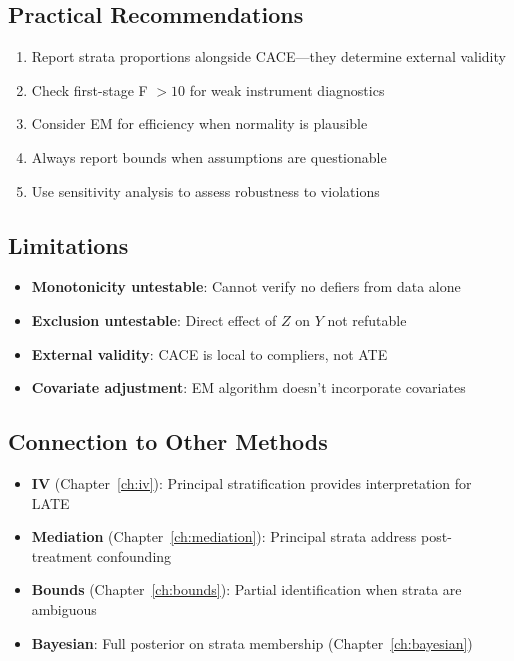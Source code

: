 \subsection{Practical Recommendations}

\begin{enumerate}
\item Report strata proportions alongside CACE---they determine external validity
\item Check first-stage F $> 10$ for weak instrument diagnostics
\item Consider EM for efficiency when normality is plausible
\item Always report bounds when assumptions are questionable
\item Use sensitivity analysis to assess robustness to violations
\end{enumerate}

\subsection{Limitations}

\begin{itemize}
\item \textbf{Monotonicity untestable}: Cannot verify no defiers from data alone
\item \textbf{Exclusion untestable}: Direct effect of $Z$ on $Y$ not refutable
\item \textbf{External validity}: CACE is local to compliers, not ATE
\item \textbf{Covariate adjustment}: EM algorithm doesn't incorporate covariates
\end{itemize}

\subsection{Connection to Other Methods}

\begin{itemize}
\item \textbf{IV} (Chapter~\ref{ch:iv}): Principal stratification provides interpretation for LATE
\item \textbf{Mediation} (Chapter~\ref{ch:mediation}): Principal strata address post-treatment confounding
\item \textbf{Bounds} (Chapter~\ref{ch:bounds}): Partial identification when strata are ambiguous
\item \textbf{Bayesian}: Full posterior on strata membership (Chapter~\ref{ch:bayesian})
\end{itemize}
